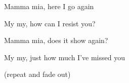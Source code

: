 \begin{song}
\bigskip

Mamma mia, here I go again \par
{} My  my, how can I resist you? \par
{}Mamma mia, does it show again? \par
{} My  my, just how much I've missed you \par

\bigskip

\Bridge

\bigskip

\Outro {}    (repeat and fade out) \par

\end{song}
